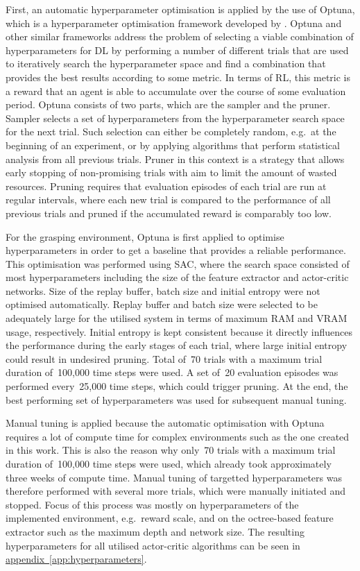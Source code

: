 First, an automatic hyperparameter optimisation is applied by the use of Optuna, which is a hyperparameter optimisation framework developed by \citet{akiba_optuna_2019}. Optuna and other similar frameworks address the problem of selecting a viable combination of hyperparameters for DL by performing a number of different trials that are used to iteratively search the hyperparameter space and find a combination that provides the best results according to some metric. In terms of RL, this metric is a reward that an agent is able to accumulate over the course of some evaluation period. Optuna consists of two parts, which are the sampler and the pruner. Sampler selects a set of hyperparameters from the hyperparameter search space for the next trial. Such selection can either be completely random, e.g.~at the beginning of an experiment, or by applying algorithms that perform statistical analysis from all previous trials. Pruner in this context is a strategy that allows early stopping of non-promising trials with aim to limit the amount of wasted resources. Pruning requires that evaluation episodes of each trial are run at regular intervals, where each new trial is compared to the performance of all previous trials and pruned if the accumulated reward is comparably too low.

For the grasping environment, Optuna is first applied to optimise hyperparameters in order to get a baseline that provides a reliable performance. This optimisation was performed using SAC, where the search space consisted of most hyperparameters including the size of the feature extractor and actor-critic networks. Size of the replay buffer, batch size and initial entropy were not optimised automatically. Replay buffer and batch size were selected to be adequately large for the utilised system in terms of maximum RAM and VRAM usage, respectively. Initial entropy is kept consistent because it directly influences the performance during the early stages of each trial, where large initial entropy could result in undesired pruning. Total of~70 trials with a maximum trial duration of~100,000 time steps were used. A set of~20 evaluation episodes was performed every~25,000 time steps, which could trigger pruning. At the end, the best performing set of hyperparameters was used for subsequent manual tuning.

Manual tuning is applied because the automatic optimisation with Optuna requires a lot of compute time for complex environments such as the one created in this work. This is also the reason why only~70 trials with a maximum trial duration of~100,000 time steps were used, which already took approximately three weeks of compute time. Manual tuning of targetted hyperparameters was therefore performed with several more trials, which were manually initiated and stopped. Focus of this process was mostly on hyperparameters of the implemented environment, e.g.~reward scale, and on the octree-based feature extractor such as the maximum depth and network size. The resulting hyperparameters for all utilised actor-critic algorithms can be seen in \hyperref[app:hyperparameters]{appendix~\ref*{app:hyperparameters}}.
